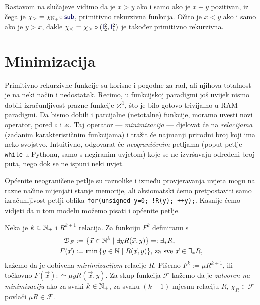 \begin{primjer}[{name=[primitivna rekurzivnost relacija strogog uređaja]}]\label{pr:m-v}
Rastavom na slučajeve vidimo da je $x>y$ ako i samo ako je $x\dotminus y$ pozitivan, iz čega je $\chi_>=\chi_{\N_+}\!\circ\f{sub}$, pri\-mi\-tiv\-no rekurzivna funkcija. Očito je $x<y$ ako i samo ako je $y>x$, dakle $\chi_<=\chi_>\circ(\f I_2^2,\f I_1^2)$ je također primitivno rekurzivna.
\end{primjer}

\section{Minimizacija}

Primitivno rekurzivne funkcije su korisne i pogodne za rad, ali njihova totalnost je na neki način i nedostatak. Recimo, u funkcijskoj paradigmi još uvijek nismo dobili izračunljivost prazne funkcije $\varnothing^1$, što je bilo gotovo trivijalno u RAM-paradigmi. Da bismo dobili i parcijalne (netotalne) funkcije, moramo uvesti novi operator, pored $\circ$ i $\pr$. Taj operator --- \emph{minimizacija} --- djelovat će na \emph{relacijama} (zadanim karakterističnim funkcijama) i tražit će najmanji prirodni broj koji ima neko svojstvo. Intuitivno, odgovarat će \emph{neograničenim} petljama (poput petlje \texttt{while} u Pythonu, samo s negiranim uvjetom) koje se ne izvršavaju određeni broj puta, nego dok se ne ispuni neki uvjet.

Općenite neograničene petlje su raznolike i između provjeravanja uvjeta mogu na razne načine mijenjati stanje memorije, ali aksiomatski ćemo pretpostaviti samo izračunljivost petlji oblika \texttt{for(unsigned y=0; !R(y); ++y);}. Kasnije ćemo vidjeti da u tom modelu možemo pisati i općenite petlje.

\begin{definicija}[{name=[minimizacija]}]
Neka je $k\in{\mathbb N}_+$ i $R^{k+1}$ relacija. Za funkciju $F^k$ definiranu s
\begin{align}
    \label{eq:dommu}\mathcal D_{F}&:=\{\vec x\in{\mathbb N}^k\mid\exists yR(\vec x,y)\}=:\exists_*R\text,\\
    F(\vec x)&:=\min\,\{y\in{\mathbb N}\mid R(\vec x,y)\}\text{, za sve $\vec x\in\exists_* R$,}
\end{align}
kažemo da je dobivena \emph{minimizacijom} relacije $R$.
	Pišemo $F^k:=\mu R^{k+1}$, ili točkovno $F(\vec x):\simeq\mu yR(\vec x,y)$.
    Za skup funkcija $\mathcal F$ kažemo da je \emph{zatvoren na minimizaciju} ako za svaki $k\in{\mathbb N}_+$, za svaku $(k+1)$-mjesnu relaciju $R$, $\chi_R\in\mathcal F$ povlači $\mu R\in\mathcal F$. 
\end{definicija}

